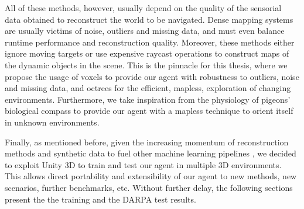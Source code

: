 All of these methods, however, usually depend on the quality of the sensorial data obtained to reconstruct the world to be navigated.
Dense mapping systems are usually victims of noise, outliers and missing data, and must even balance runtime performance and reconstruction quality. Moreover, these methods either ignore moving targets or use expensive raycast operations to construct maps of the dynamic objects in the scene. \cite{weder2020routedfusion, pfeiffer2018reinforced, grinvald2021tsdf} %
This is the pinnacle for this thesis, where we propose the usage of voxels to provide our agent with robustness to outliers, noise and missing data, and octrees for the efficient, mapless, exploration of changing environments. 
Furthermore, we take inspiration from the physiology of pigeons' biological compass to provide our agent with a mapless technique to orient itself in unknown environments.

Finally, as mentioned before, given the increasing momentum of reconstruction methods and synthetic data to fuel other machine learning pipelines \cite{yu2021plenoxels, nvidia2021synthetic}, we decided to exploit Unity 3D to train and test our agent in multiple 3D environments. This allows direct portability and extensibility of our agent to new methods, new scenarios, further benchmarks, etc. 
Without further delay, the following sections present the the training and the DARPA test results.








